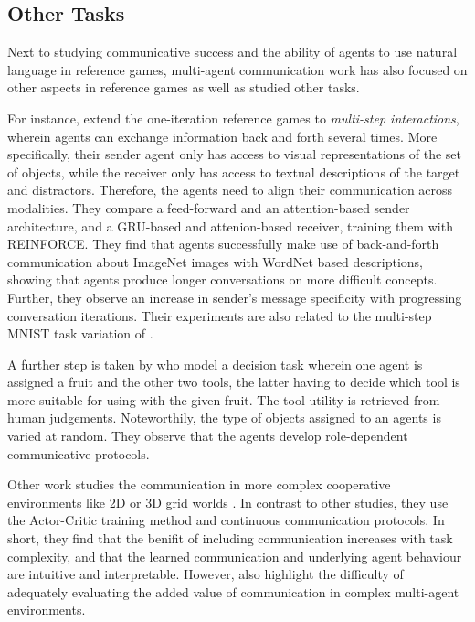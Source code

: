 \subsection{Other Tasks}

Next to studying communicative success and the ability of agents to use natural language in reference games, multi-agent communication work has also focused on other aspects in reference games as well as studied other tasks.
 
For instance, \cite{evtimova2017emergent} extend the one-iteration reference games to \textit{multi-step interactions}, wherein agents can exchange information back and forth several times. More specifically, their sender agent only has access to visual representations of the set of objects, while the receiver only has access to textual descriptions of the target and distractors. Therefore, the agents need to align their communication across modalities. They compare a feed-forward and an attention-based sender architecture, and a GRU-based and attenion-based receiver, training them with REINFORCE. They find that agents successfully make use of back-and-forth communication about ImageNet images with WordNet based descriptions, showing that agents produce longer conversations on more difficult concepts. Further, they observe an increase in sender's message specificity with progressing conversation iterations.
Their experiments are also related to the multi-step MNIST task variation of \cite{foerster2016learning}.

A further step is taken by \cite{bouchacourt2019miss} who model a decision task wherein one agent is assigned a fruit and the other two tools, the latter having to decide which tool is more suitable for using with the given fruit. The tool utility is retrieved from human judgements. Noteworthily, the type of objects assigned to an agents is varied at random. They observe that the agents develop role-dependent communicative protocols. 

Other work studies the communication in more complex cooperative environments like 2D or 3D grid worlds \parencite{das2019tarmac}. In contrast to other studies, they use the Actor-Critic training method and continuous communication protocols. In short, they find that the benifit of including communication increases with task complexity, and that the learned communication and underlying agent behaviour are intuitive and interpretable. However, \cite{lowe2019pitfalls} also highlight the difficulty of adequately evaluating the added value of communication in complex multi-agent environments.

